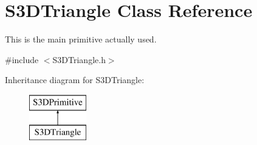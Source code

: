 \hypertarget{class_s3_d_triangle}{
\section{S3DTriangle Class Reference}
\label{class_s3_d_triangle}
}


This is the main primitive actually used.  




{\ttfamily \#include $<$S3DTriangle.h$>$}

Inheritance diagram for S3DTriangle:\begin{figure}[H]
\begin{center}
\leavevmode
\includegraphics[height=2cm]{class_s3_d_triangle}
\end{center}
\end{figure}
